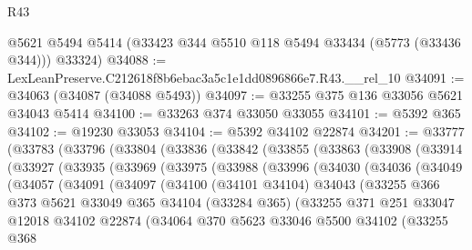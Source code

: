 \begin{lexlean}{R43}
\begin{coremodule}
      @5621
      @5494
      @5414
      (@33423 @344 @5510 @118 @5494 @33434 (@5773 (@33436 @344)))
      @33324)
@34088 := LexLeanPreserve.C212618f8b6ebac3a5c1e1dd0896866e7.R43.__rel_10
@34091 := @34063 (@34087 (@34088 @5493))
@34097 := @33255 @375 @136 @33056 @5621 @34043 @5414
@34100 := @33263 @374 @33050 @33055
@34101 := @5392 @365
@34102 := @19230 @33053
@34104 := @5392 @34102 @22874
@34201 := @33777
    (@33783
      (@33796
        (@33804
          (@33836
            (@33842
              (@33855
                (@33863
                  (@33908
                    (@33914
                      (@33927
                        (@33935
                          (@33969
                            (@33975
                              (@33988
                                (@33996
                                  (@34030
                                    (@34036
                                      (@34049
                                        (@34057
                                          (@34091
                                            (@34097
                                              (@34100
                                                (@34101 @34104)
                                                @34043
                                                (@33255
                                                  @366
                                                  @373
                                                  @5621
                                                  @33049
                                                  @365
                                                  @34104
                                                  (@33284 @365)
                                                  (@33255
                                                    @371
                                                    @251
                                                    @33047
                                                    @12018
                                                    @34102
                                                    @22874
                                                    (@34064
                                                      @370
                                                      @5623
                                                      @33046
                                                      @5500
                                                      @34102
                                                      (@33255
                                                        @368

\end{coremodule}
\end{lexlean}
